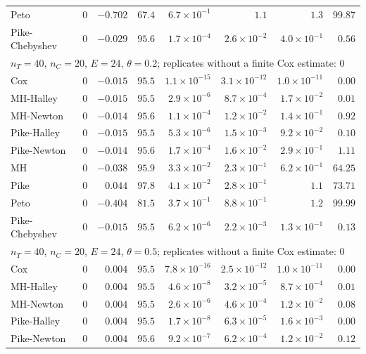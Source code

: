 \begin{landscape}
\begin{longtable}{lrrrrrrr}
Peto & 0 & $-0.702$ & $67.4$ & $6.7 \times 10^{-1}$ & $1.1$ & $1.3$ & $99.87$ \\
Pike-Chebyshev & 0 & $-0.029$ & $95.6$ & $1.7 \times 10^{-4}$ & $2.6 \times 10^{-2}$ & $4.0 \times 10^{-1}$ & $0.56$ \\
\multicolumn{8}{l}{$n_T = 40$, $n_C = 20$, $E = 24$, $\theta = 0.2$; replicates without a finite Cox estimate: 0} \\
Cox & 0 & $-0.015$ & $95.5$ & $1.1 \times 10^{-15}$ & $3.1 \times 10^{-12}$ & $1.0 \times 10^{-11}$ & $0.00$ \\
MH-Halley & 0 & $-0.015$ & $95.5$ & $2.9 \times 10^{-6}$ & $8.7 \times 10^{-4}$ & $1.7 \times 10^{-2}$ & $0.01$ \\
MH-Newton & 0 & $-0.014$ & $95.6$ & $1.1 \times 10^{-4}$ & $1.2 \times 10^{-2}$ & $1.4 \times 10^{-1}$ & $0.92$ \\
Pike-Halley & 0 & $-0.015$ & $95.5$ & $5.3 \times 10^{-6}$ & $1.5 \times 10^{-3}$ & $9.2 \times 10^{-2}$ & $0.10$ \\
Pike-Newton & 0 & $-0.014$ & $95.6$ & $1.7 \times 10^{-4}$ & $1.6 \times 10^{-2}$ & $2.9 \times 10^{-1}$ & $1.11$ \\
MH & 0 & $-0.038$ & $95.9$ & $3.3 \times 10^{-2}$ & $2.3 \times 10^{-1}$ & $6.2 \times 10^{-1}$ & $64.25$ \\
Pike & 0 & $0.044$ & $97.8$ & $4.1 \times 10^{-2}$ & $2.8 \times 10^{-1}$ & $1.1$ & $73.71$ \\
Peto & 0 & $-0.404$ & $81.5$ & $3.7 \times 10^{-1}$ & $8.8 \times 10^{-1}$ & $1.2$ & $99.99$ \\
Pike-Chebyshev & 0 & $-0.015$ & $95.5$ & $6.2 \times 10^{-6}$ & $2.2 \times 10^{-3}$ & $1.3 \times 10^{-1}$ & $0.13$ \\
\multicolumn{8}{l}{$n_T = 40$, $n_C = 20$, $E = 24$, $\theta = 0.5$; replicates without a finite Cox estimate: 0} \\
Cox & 0 & $0.004$ & $95.5$ & $7.8 \times 10^{-16}$ & $2.5 \times 10^{-12}$ & $1.0 \times 10^{-11}$ & $0.00$ \\
MH-Halley & 0 & $0.004$ & $95.5$ & $4.6 \times 10^{-8}$ & $3.2 \times 10^{-5}$ & $8.7 \times 10^{-4}$ & $0.01$ \\
MH-Newton & 0 & $0.004$ & $95.5$ & $2.6 \times 10^{-6}$ & $4.6 \times 10^{-4}$ & $1.2 \times 10^{-2}$ & $0.08$ \\
Pike-Halley & 0 & $0.004$ & $95.5$ & $1.7 \times 10^{-8}$ & $6.3 \times 10^{-5}$ & $1.6 \times 10^{-3}$ & $0.00$ \\
Pike-Newton & 0 & $0.004$ & $95.6$ & $9.2 \times 10^{-7}$ & $6.2 \times 10^{-4}$ & $1.2 \times 10^{-2}$ & $0.12$ \\

\end{longtable}
\end{landscape}
